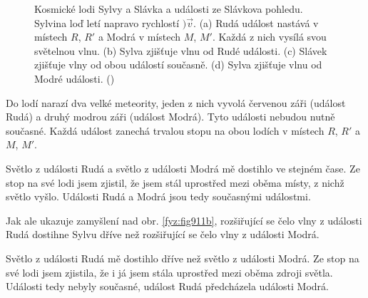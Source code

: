       \begin{figure}[ht!]  %
        \centering
         \newline    
         \newline   
         \newline
        \caption{Kosmické lodi Sylvy a Slávka a události ze Slávkova pohledu. Sylvina loď letí
          napravo rychlostí \()\vec{v}\). (a) Rudá událost nastává v místech \(R\), \(R'\) a Modrá v
          místech \(M\), \(M'\). Každá z nich vysílá svou světelnou vlnu. (b) Sylva zjišťuje vlnu od
          Rudé události. (c) Slávek zjišťuje vlny od obou událostí současně. (d) Sylva zjišťuje vlnu
          od Modré události. (\cite[s.~1010]{Halliday2001})}
        \label{fyz:fig911}
      \end{figure}
      
      Do lodí narazí dva velké meteority, jeden z nich vyvolá červenou záři (událost Rudá) a druhý
      modrou záři (událost Modrá). Tyto události nebudou nutně současné. Každá událost zanechá
      trvalou stopu na obou lodích v místech \(R\), \(R′\) a \(M\), \(M′\).

      \begin{description}[leftmargin=3em,labelindent=1em, style=nextline]
       \item [SLÁVEK řekne:] Světlo z události Rudá a světlo z události Modrá mě dostihlo ve stejném
             čase. Ze stop na své lodi jsem zjistil, že jsem stál uprostřed mezi oběma místy, z
             nichž světlo vyšlo. Události Rudá a Modrá jsou tedy současnými událostmi. 
      \end{description}
      
      Jak ale ukazuje zamyšlení nad obr. \ref{fyz:fig911b}, rozšiřující se čelo vlny z události Rudá
      dostihne Sylvu dříve než rozšiřující se čelo vlny z události Modrá. 
      
      \begin{description}[leftmargin=3em,labelindent=1em, style=nextline]
        \item [SYLVA řekne:] Světlo z události Rudá mě dostihlo dříve než světlo z události Modrá. Ze stop
              na své lodi jsem zjistila, že i já jsem stála uprostřed mezi oběma zdroji světla.
              Události tedy nebyly současné, událost Rudá předcházela události Modrá. 
      \end{description}
        
